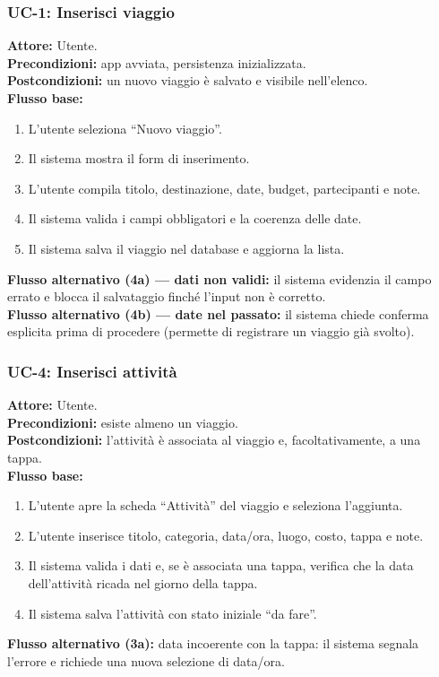 \documentclass[11pt, a4paper]{article}
\begin{document}
\subsubsection*{UC-1: Inserisci viaggio}
\textbf{Attore:} Utente.\\
\textbf{Precondizioni:} app avviata, persistenza inizializzata.\\
\textbf{Postcondizioni:} un nuovo viaggio è salvato e visibile nell'elenco.\\
\textbf{Flusso base:}
\begin{enumerate}[nosep]
    \item L'utente seleziona ``Nuovo viaggio''.
    \item Il sistema mostra il form di inserimento.
    \item L'utente compila titolo, destinazione, date, budget, partecipanti e note.
    \item Il sistema valida i campi obbligatori e la coerenza delle date.
    \item Il sistema salva il viaggio nel database e aggiorna la lista.
\end{enumerate}
\textbf{Flusso alternativo (4a) --- dati non validi:} il sistema evidenzia il campo
errato e blocca il salvataggio finché l'input non è corretto. \\
\textbf{Flusso alternativo (4b) --- date nel passato:} il sistema chiede conferma
esplicita prima di procedere (permette di registrare un viaggio già svolto).

\subsubsection*{UC-4: Inserisci attività}
\textbf{Attore:} Utente.\\
\textbf{Precondizioni:} esiste almeno un viaggio.\\
\textbf{Postcondizioni:} l'attività è associata al viaggio e, facoltativamente, a una tappa.\\
\textbf{Flusso base:}
\begin{enumerate}[nosep]
    \item L'utente apre la scheda ``Attività'' del viaggio e seleziona l'aggiunta.
    \item L'utente inserisce titolo, categoria, data/ora, luogo, costo, tappa e note.
    \item Il sistema valida i dati e, se è associata una tappa, verifica che la data
    dell'attività ricada nel giorno della tappa.
    \item Il sistema salva l'attività con stato iniziale ``da fare''.
\end{enumerate}
\textbf{Flusso alternativo (3a):} data incoerente con la tappa: il sistema segnala
l'errore e richiede una nuova selezione di data/ora.
\end{document}
